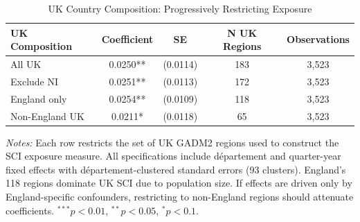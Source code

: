 \begin{table}[htbp]
\centering
\caption{UK Country Composition: Progressively Restricting Exposure}
\label{tab:distance}
\begin{tabular}{lcccc}
\toprule
UK Composition & Coefficient & SE & N UK Regions & Observations \\
\midrule
All UK & 0.0250** & (0.0114) & 183 & 3,523 \\
Exclude NI & 0.0251** & (0.0113) & 172 & 3,523 \\
England only & 0.0254** & (0.0109) & 118 & 3,523 \\
Non-England UK & 0.0211* & (0.0118) & 65 & 3,523 \\
\bottomrule
\end{tabular}
\begin{minipage}{0.9\textwidth}
\footnotesize \textit{Notes:} Each row restricts the set of UK GADM2 regions used to construct the SCI exposure measure. All specifications include d\'epartement and quarter-year fixed effects with d\'epartement-clustered standard errors (93 clusters). England's 118 regions dominate UK SCI due to population size. If effects are driven only by England-specific confounders, restricting to non-England regions should attenuate coefficients. $^{***}p<0.01$, $^{**}p<0.05$, $^{*}p<0.1$.
\end{minipage}
\end{table}
